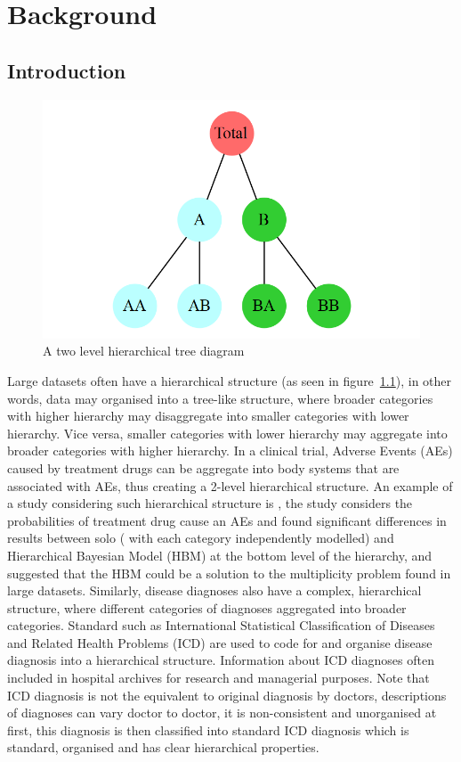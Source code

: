 



\chapter{Background}\label{chap:Background}

\section{Introduction}

\begin{figure}[b]
	\centering
	\includegraphics[width=0.4\linewidth]{Figures/treesimple}
	\caption{A two level hierarchical tree diagram}
	\label{fig:htstree}
\end{figure}

Large datasets often have a hierarchical structure (as seen in figure~\ref{fig:htstree}), in other words, data may organised into a tree-like structure, where broader categories with higher hierarchy may disaggregate into smaller categories with lower hierarchy. Vice versa, smaller categories with lower hierarchy may aggregate into broader categories with higher hierarchy. In a clinical trial, Adverse Events (AEs) caused by treatment drugs can be aggregate into body systems that are associated with AEs, thus creating a 2-level hierarchical structure. An example of a study considering such hierarchical structure is \cite{berry2004}, the study considers the probabilities of treatment drug cause an AEs and found significant differences in results between solo ( with each category independently modelled) and Hierarchical Bayesian Model (HBM) at the bottom level of the hierarchy, and suggested that the HBM could be a solution to the multiplicity problem found in large datasets. Similarly, disease diagnoses also have a complex, hierarchical structure, where different categories of diagnoses aggregated into broader categories. Standard such as International Statistical Classification of Diseases and Related Health Problems (ICD)\citep{WHO2019} are used to code for and organise disease diagnosis into a hierarchical structure. Information about ICD diagnoses often included in hospital archives for research and managerial purposes. Note that ICD diagnosis is not the equivalent to original diagnosis by doctors, descriptions of diagnoses can vary doctor to doctor, it is non-consistent and unorganised at first, this diagnosis is then classified into standard ICD diagnosis which is standard, organised and has clear hierarchical properties. 

